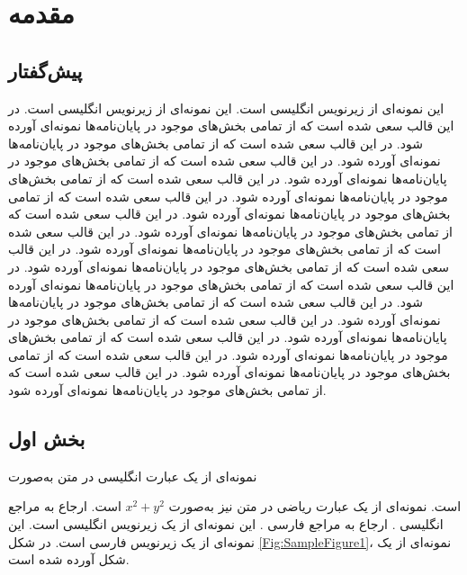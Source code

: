 \chapter{مقدمه}
\section{پیش‌گفتار}
این نمونه‌ای از زیرنویس  انگلیسی است.	
این نمونه‌ای از زیرنویس  انگلیسی است.	
در این قالب سعی شده است که از تمامی بخش‌های موجود در پایان‌نامه‌ها نمونه‌ای آورده شود. در این قالب سعی شده است که از تمامی بخش‌های موجود در پایان‌نامه‌ها نمونه‌ای آورده شود. در این قالب سعی شده است که از تمامی بخش‌های موجود در پایان‌نامه‌ها نمونه‌ای آورده شود. در این قالب سعی شده است که از تمامی بخش‌های موجود در پایان‌نامه‌ها نمونه‌ای آورده شود. در این قالب سعی شده است که از تمامی بخش‌های موجود در پایان‌نامه‌ها نمونه‌ای آورده شود. در این قالب سعی شده است که از تمامی بخش‌های موجود در پایان‌نامه‌ها نمونه‌ای آورده شود. در این قالب سعی شده است که از تمامی بخش‌های موجود در پایان‌نامه‌ها نمونه‌ای آورده شود. در این قالب سعی شده است که از تمامی بخش‌های موجود در پایان‌نامه‌ها نمونه‌ای آورده شود. در این قالب سعی شده است که از تمامی بخش‌های موجود در پایان‌نامه‌ها نمونه‌ای آورده شود. در این قالب سعی شده است که از تمامی بخش‌های موجود در پایان‌نامه‌ها نمونه‌ای آورده شود. در این قالب سعی شده است که از تمامی بخش‌های موجود در پایان‌نامه‌ها نمونه‌ای آورده شود. در این قالب سعی شده است که از تمامی بخش‌های موجود در پایان‌نامه‌ها نمونه‌ای آورده شود. در این قالب سعی شده است که از تمامی بخش‌های موجود در پایان‌نامه‌ها نمونه‌ای آورده شود. در این قالب سعی شده است که از تمامی بخش‌های موجود در پایان‌نامه‌ها نمونه‌ای آورده شود.
\section{بخش اول}
نمونه‌ای از یک عبارت انگلیسی در متن به‌صورت

است. نمونه‌ای از یک عبارت ریاضی در متن نیز به‌صورت
$x^2 + y^2$
است. ارجاع به مراجع انگلیسی
\cite{Fakhari2015a,Lewis2003}.
ارجاع به مراجع فارسی
\cite{Fakhari2015b,HadianThesis2008}.
این نمونه‌ای از یک زیرنویس انگلیسی%
است. این نمونه‌ای از یک زیرنویس فارسی%
است. در شکل
\ref{Fig:SampleFigure1}،
نمونه‌ای از یک شکل آورده شده است. 

